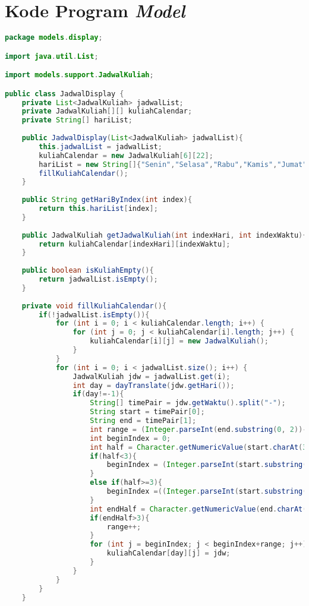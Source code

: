 \chapter{Kode Program \textit{Model}}

\singlespacing 
\begin{lstlisting}[language=Java,basicstyle=\tiny,caption=JadwalDisplay.java]
package models.display;

import java.util.List;

import models.support.JadwalKuliah;

public class JadwalDisplay {
	private List<JadwalKuliah> jadwalList;
	private JadwalKuliah[][] kuliahCalendar;
	private String[] hariList;
	
	public JadwalDisplay(List<JadwalKuliah> jadwalList){
		this.jadwalList = jadwalList;
		kuliahCalendar = new JadwalKuliah[6][22];
		hariList = new String[]{"Senin","Selasa","Rabu","Kamis","Jumat","Sabtu","Minggu"};
		fillKuliahCalendar();
	}
	
	public String getHariByIndex(int index){
		return this.hariList[index];
	}
	
	public JadwalKuliah getJadwalKuliah(int indexHari, int indexWaktu){
		return kuliahCalendar[indexHari][indexWaktu];
	}
	
	public boolean isKuliahEmpty(){
		return jadwalList.isEmpty();
	}
	
	private void fillKuliahCalendar(){
		if(!jadwalList.isEmpty()){
            for (int i = 0; i < kuliahCalendar.length; i++) {
                for (int j = 0; j < kuliahCalendar[i].length; j++) {
                    kuliahCalendar[i][j] = new JadwalKuliah();
                }
            }
            for (int i = 0; i < jadwalList.size(); i++) {
                JadwalKuliah jdw = jadwalList.get(i);
                int day = dayTranslate(jdw.getHari());
                if(day!=-1){
                	String[] timePair = jdw.getWaktu().split("-");
                    String start = timePair[0];
                    String end = timePair[1];
                    int range = (Integer.parseInt(end.substring(0, 2))- Integer.parseInt(start.substring(0, 2)))*2;
                    int beginIndex = 0;
                    int half = Character.getNumericValue(start.charAt(3));
                    if(half<3){
                        beginIndex = (Integer.parseInt(start.substring(0, 2))-7)*2;
                    }
                    else if(half>=3){
                        beginIndex =((Integer.parseInt(start.substring(0, 2))-7)*2)+1;
                    }
                    int endHalf = Character.getNumericValue(end.charAt(3));
                    if(endHalf>3){
                    	range++;  
                    }
                    for (int j = beginIndex; j < beginIndex+range; j++) {
                    	kuliahCalendar[day][j] = jdw;      	
                    }
                }
            }
        }
	}
	

\end{lstlisting}
